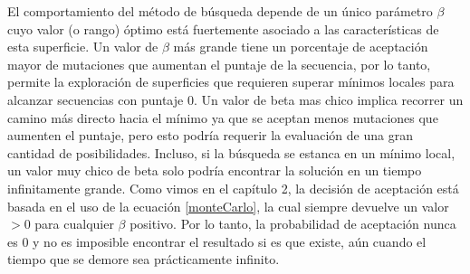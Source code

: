 El comportamiento del método de búsqueda depende de un único parámetro $\beta$ cuyo valor (o rango) óptimo está fuertemente asociado a las características de esta superficie.
Un valor de $\beta$ más grande tiene un porcentaje de aceptación mayor de mutaciones que aumentan el puntaje de la secuencia, por lo tanto, permite la exploración de superficies que 
requieren superar mínimos locales para alcanzar secuencias con puntaje 0.
Un valor de beta mas chico implica recorrer un camino más directo hacia el mínimo ya que se aceptan menos mutaciones que aumenten el puntaje, pero esto podría requerir la evaluación de una gran cantidad de posibilidades. 
Incluso, si la búsqueda se estanca en un mínimo local, un valor muy chico de beta solo podría encontrar la solución en un tiempo infinitamente 
grande. Como vimos en el capítulo 2, la decisión de aceptación está basada en el uso de la ecuación \ref{monteCarlo}, la cual siempre devuelve un valor $>0$ para cualquier $\beta$ positivo.
Por lo tanto, la probabilidad de aceptación nunca es 0 y no es imposible encontrar el resultado si es que existe, aún cuando el tiempo que se demore sea prácticamente infinito.


